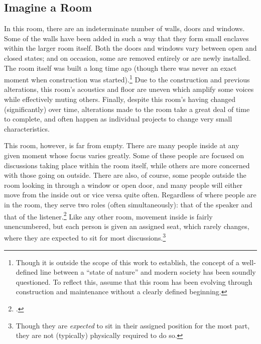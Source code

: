 \documentclass{article}
\begin{document}
\subsection{Imagine a Room}
In this room, there are an indeterminate number of walls, doors and windows.
Some of the walls have been added in such a way that they form small enclaves within the larger room itself.
Both the doors and windows vary between open and closed states; and on occasion, some are removed entirely or are newly installed.
The room itself was built a long time ago (though there was never an exact moment when construction was started).\footnote{Though it is outside the scope of this work to establish, the concept of a well-defined line between a ``state of nature'' and modern society has been soundly questioned. To reflect this, assume that this room has been evolving through construction and maintenance without a clearly defined beginning.}
Due to the construction and previous alterations, this room's acoustics and floor are uneven which amplify some voices while effectively muting others. 
Finally, despite this room's having changed (significantly) over time, alterations made to the room take a great deal of time to complete, and often happen as individual projects to change very small characteristics.

This room, however, is far from empty. There are many people inside at any given moment whose focus varies greatly.
Some of these people are focused on discussions taking place within the room itself, while others are more concerned with those going on outside.
There are also, of course, some people outside the room looking in through a window or open door, and many people will either move from the inside out or vice versa quite often.
Regardless of where people are in the room, they serve two roles (often simultaneously): that of the speaker and that of the listener.\footcite[4]{bickford96}
Like any other room, movement inside is fairly unencumbered, but each person is given an assigned seat, which rarely changes, where they are expected to sit for most discussions.\footnote{Though they are \emph{expected} to sit in their assigned position for the most part, they are not (typically) physically required to do so.}
\end{document}
